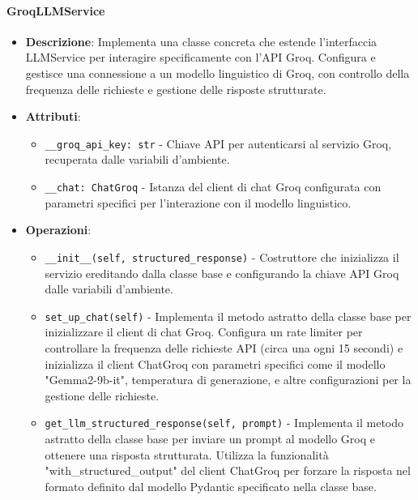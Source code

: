 \documentclass[10pt]{article}
\begin{document}
    \paragraph{GroqLLMService}
    \begin{itemize} 
    \item \textbf{Descrizione}: Implementa una classe concreta che estende l'interfaccia LLMService per interagire specificamente con l'API Groq. Configura e gestisce una connessione a un modello linguistico di Groq, con controllo della frequenza delle richieste e gestione delle risposte strutturate.
    \item \textbf{Attributi}:
    \begin{itemize}
        \item \texttt{\_\_groq\_api\_key: str} - Chiave API per autenticarsi al servizio Groq, recuperata dalle variabili d'ambiente.
        \item \texttt{\_\_chat: ChatGroq} - Istanza del client di chat Groq configurata con parametri specifici per l'interazione con il modello linguistico.
    \end{itemize}
    
    \item \textbf{Operazioni}:
    \begin{itemize}
        \item \texttt{\_\_init\_\_(self, structured\_response)} - Costruttore che inizializza il servizio ereditando dalla classe base e configurando la chiave API Groq dalle variabili d'ambiente.
        
        \item \texttt{set\_up\_chat(self)} - Implementa il metodo astratto della classe base per inizializzare il client di chat Groq. Configura un rate limiter per controllare la frequenza delle richieste API (circa una ogni 15 secondi) e inizializza il client ChatGroq con parametri specifici come il modello "Gemma2-9b-it", temperatura di generazione, e altre configurazioni per la gestione delle richieste.
        
        \item \texttt{get\_llm\_structured\_response(self, prompt)} - Implementa il metodo astratto della classe base per inviare un prompt al modello Groq e ottenere una risposta strutturata. Utilizza la funzionalità "with\_structured\_output" del client ChatGroq per forzare la risposta nel formato definito dal modello Pydantic specificato nella classe base.
    \end{itemize}
    \end{itemize}
\end{document}
